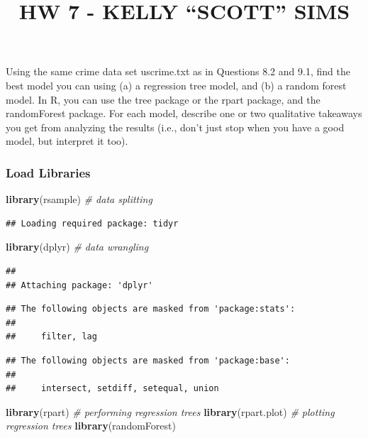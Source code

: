 \documentclass[]{article}
\title{HW 7 - KELLY ``SCOTT'' SIMS}
\author{}
\date{}
\newenvironment{Shaded}{\begin{snugshade}}{\end{snugshade}}
\newcommand{\KeywordTok}[1]{\textcolor[rgb]{0.13,0.29,0.53}{\textbf{#1}}}
\newcommand{\CommentTok}[1]{\textcolor[rgb]{0.56,0.35,0.01}{\textit{#1}}}
\newcommand{\NormalTok}[1]{#1}
\begin{document}
\maketitle

Using the same crime data set uscrime.txt as in Questions 8.2 and 9.1,
find the best model you can using (a) a regression tree model, and (b) a
random forest model. In R, you can use the tree package or the rpart
package, and the randomForest package. For each model, describe one or
two qualitative takeaways you get from analyzing the results (i.e.,
don't just stop when you have a good model, but interpret it too).

\subsubsection{Load Libraries}\label{load-libraries}

\begin{Shaded}
\begin{Highlighting}[]
\KeywordTok{library}\NormalTok{(rsample)     }\CommentTok{# data splitting }
\end{Highlighting}
\end{Shaded}

\begin{verbatim}
## Loading required package: tidyr
\end{verbatim}

\begin{Shaded}
\begin{Highlighting}[]
\KeywordTok{library}\NormalTok{(dplyr)       }\CommentTok{# data wrangling}
\end{Highlighting}
\end{Shaded}

\begin{verbatim}
## 
## Attaching package: 'dplyr'
\end{verbatim}

\begin{verbatim}
## The following objects are masked from 'package:stats':
## 
##     filter, lag
\end{verbatim}

\begin{verbatim}
## The following objects are masked from 'package:base':
## 
##     intersect, setdiff, setequal, union
\end{verbatim}

\begin{Shaded}
\begin{Highlighting}[]
\KeywordTok{library}\NormalTok{(rpart)       }\CommentTok{# performing regression trees}
\KeywordTok{library}\NormalTok{(rpart.plot)  }\CommentTok{# plotting regression trees}
\KeywordTok{library}\NormalTok{(randomForest)}
\end{Highlighting}
\end{Shaded}
\end{document}
